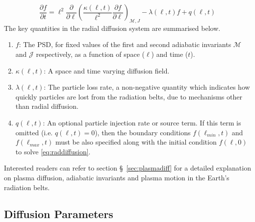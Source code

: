 %
\begin{equation}\label{eq:raddiffusion}
  \frac{\partial{f}}{\partial{t}} = \ell^2 \frac{\partial}{\partial{\ell}} \left( 
    \frac{\kappa(\ell, t)}{\ell^{2}} \frac{\partial{f}}{\partial{\ell}}
  \right)_{\mathcal{M}, J} - \lambda(\ell, t) f + q(\ell, t)
\end{equation}
%
The key quantities in the radial diffusion system are summarised below.
%
\begin{enumerate}
\item $f$: The PSD, for fixed values of the first and second adiabatic invariants $\mathcal{M}$ 
      and $\mathcal{J}$ respectively, as a function of space ($\ell$) and time ($t$).
\item $\kappa(\ell, t)$: A space and time varying diffusion field.
\item $\lambda(\ell, t)$: The particle loss rate, a non-negative quantity which indicates how 
quickly particles are lost from the radiation belts, due to mechanisms other than radial diffusion.
\item $q(\ell, t)$: An optional particle injection rate or source term. If this term is omitted 
      (i.e. $q(\ell, t) = 0$), then the boundary conditions $f(\ell_{min}, t)$ and 
      $f(\ell_{max}, t)$ must be also specified along with the initial condition $f(\ell, 0)$ 
      to solve \cref{eq:raddiffusion}. 
\end{enumerate}
%
Interested readers can refer to section \S~\ref{sec:plasmadiff} for a detailed explanation on 
plasma diffusion, adiabatic invariants and plasma motion in the Earth's radiation belts. 

\subsection{Diffusion Parameters}\label{sec:radDiffParams}

